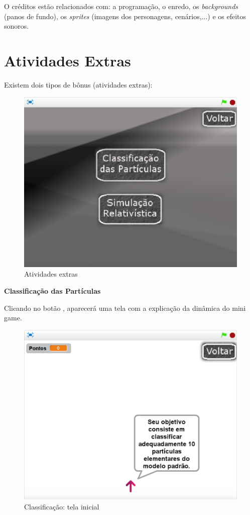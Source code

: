 \documentclass[12pt,fleqn]{book} %
\begin{document}
O créditos estão relacionados com: a programação, o enredo, os \textit{backgrounds} (panos de fundo), os \textit{sprites} (imagens dos personagens, cenários,...) e os efeitos sonoros.

\newpage

\section{Atividades Extras}

Existem dois tipos de bônus (atividades extras):

\begin{figure}[h]
	\centering
	\includegraphics[width=0.65 \textwidth]{Produto/extras}
	\caption{Atividades extras}
	\label{fig:app_a:extras}
\end{figure}


\textbf{Classificação das Partículas}

Clicando no botão , aparecerá uma tela com a explicação da dinâmica do mini game.

\begin{figure}[h]
	\centering
	\includegraphics[width=0.65 \textwidth]{Produto/class1}
	\caption{Classificação: tela inicial}
	\label{fig:app_a:class1}
\end{figure}
\end{document}
